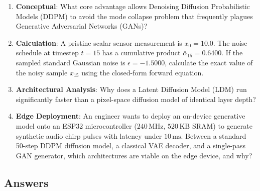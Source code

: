 \begin{checkyourself}
\begin{enumerate}
    \item \textbf{Conceptual}: What core advantage allows Denoising Diffusion Probabilistic Models (DDPM) to avoid the mode collapse problem that frequently plagues Generative Adversarial Networks (GANs)?
    \item \textbf{Calculation}: A pristine scalar sensor measurement is $x_0 = 10.0$. The noise schedule at timestep $t = 15$ has a cumulative product $\bar{\alpha}_{15} = 0.6400$. If the sampled standard Gaussian noise is $\epsilon = -1.5000$, calculate the exact value of the noisy sample $x_{15}$ using the closed-form forward equation.
    \item \textbf{Architectural Analysis}: Why does a Latent Diffusion Model (LDM) run significantly faster than a pixel-space diffusion model of identical layer depth?
    \item \textbf{Edge Deployment}: An engineer wants to deploy an on-device generative model onto an ESP32 microcontroller ($240\,\text{MHz}$, $520\,\text{KB}$ SRAM) to generate synthetic audio chirp pulses with latency under $10\,\text{ms}$. Between a standard 50-step DDPM diffusion model, a classical VAE decoder, and a single-pass GAN generator, which architectures are viable on the edge device, and why?
\end{enumerate}
\end{checkyourself}

\subsection*{Answers}


